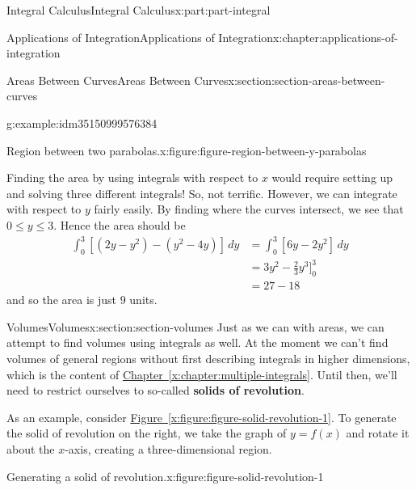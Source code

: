 \documentclass[twoside,10pt,]{tufte-book}
\newcommand{\xreffont}{\relax}
\newcommand{\terminology}[1]{\textbf{#1}}
\numberwithin{equation}{part}
\newcommand{\amp}{&}
\begin{document}
\begin{partptx}{Integral Calculus}{}{Integral Calculus}{}{}{x:part:part-integral}
\begin{chapterptx}{Applications of Integration}{}{Applications of Integration}{}{}{x:chapter:applications-of-integration}
\begin{sectionptx}{Areas Between Curves}{}{Areas Between Curves}{}{}{x:section:section-areas-between-curves}
\begin{example}{}{g:example:idm35150999576384}
\begin{figureptx}{Region between two parabolas.}{x:figure:figure-region-between-y-parabolas}{}
\begin{image}{0}{1}{0}
{
}%
\end{image}%
\tcblower
\end{figureptx}%
Finding the area by using integrals with respect to \(x\) would require setting up and solving three different integrals! So, not terrific. However, we can integrate with respect to \(y\) fairly easily. By finding where the curves intersect, we see that \(0\leq y\leq 3\). Hence the area should be%
\begin{align*}
\int_{0}^{3}[(2y - y^{2}) - (y^{2} - 4y)]\,dy \amp = \int_{0}^{3}[6y - 2y^{2}]\,dy \\
\amp = 3y^{2} - \frac{2}{3}y^{3}\Bigg]_{0}^{3} \\
\amp = 27 - 18 
\end{align*}
and so the area is just \(9\) units.%
\end{example}
\end{sectionptx}
%
%
\typeout{************************************************}
\typeout{************************************************}
%
\begin{sectionptx}{Volumes}{}{Volumes}{}{}{x:section:section-volumes}
Just as we can with areas, we can attempt to find volumes using integrals as well. At the moment we can't find volumes of general regions without first describing integrals in higher dimensions, which is the content of \hyperref[x:chapter:multiple-integrals]{Chapter~{\xreffont\ref{x:chapter:multiple-integrals}}}. Until then, we'll need to restrict ourselves to so-called \terminology{solids of revolution}.%
\par
As an example, consider \hyperref[x:figure:figure-solid-revolution-1]{Figure~{\xreffont\ref{x:figure:figure-solid-revolution-1}}}. To generate the solid of revolution on the right, we take the graph of \(y = f(x)\) and rotate it about the \(x\)-axis, creating a three-dimensional region.%
\begin{figureptx}{Generating a solid of revolution.}{x:figure:figure-solid-revolution-1}{}%
\begin{sidebyside}{2}{0}{0}{0}%
\begin{sbspanel}{0.5}%
\resizebox{\linewidth}{!}{%
}
\end{sbspanel}
\end{sidebyside}
\end{figureptx}
\end{sectionptx}
\end{chapterptx}
\end{partptx}
\end{document}
